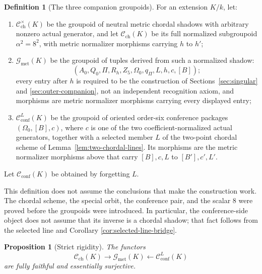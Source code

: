\documentclass[11pt]{article}
\newtheorem{proposition}[theorem]{Proposition}
\theoremstyle{definition}
\newtheorem{definition}[theorem]{Definition}
\theoremstyle{remark}
\newcommand{\cC}{\mathscr C}
\newcommand{\cG}{\mathscr G}
\begin{document}
\begin{definition}[The three companion groupoids]
\label{def:three-groupoids}
For an extension \(K/k\), let:
\begin{enumerate}[label=\textup{(\alph*)},leftmargin=2.4em]
\item \(\cC_{\mathrm{ch}}^\times(K)\) be the groupoid of neutral metric
  chordal shadows with arbitrary nonzero actual generator, and let
  \(\cC_{\mathrm{ch}}(K)\) be its full normalized subgroupoid
  \(\alpha^2=8^2\), with metric normalizer morphisms carrying \(h\) to
  \(h'\);
\item \(\cG_{\mathrm{met}}(K)\) be the groupoid of tuples derived from such a
  normalized shadow:
  \[
  (A_0,Q_0,\Pi,R_h,Z_5,\Omega_0,q_\Pi,L,h,c,[B]);
  \]
  every entry after \(h\) is required to be the construction of
  Sections~\ref{sec:singular} and \ref{sec:outer-companion}, not an
  independent recognition axiom, and morphisms are metric normalizer
  morphisms carrying every displayed entry;
\item \(\cC_{\mathrm{conf}}^L(K)\) be the groupoid of oriented order-six
  conference packages \((\Omega_0,[B],c)\), where \(c\) is one of the two
  coefficient-normalized actual generators, together with a selected member
  \(L\) of the two-point chordal scheme of
  Lemma~\ref{lem:two-chordal-lines}.  Its morphisms are the metric normalizer
  morphisms above that carry \([B],c,L\) to \([B'],c',L'\).
\end{enumerate}
Let \(\cC_{\mathrm{conf}}(K)\) be obtained by forgetting \(L\).
\end{definition}

This definition does not assume the conclusions that make the construction
work.  The chordal scheme, the special orbit, the conference pair, and the
scalar \(8\) were proved before the groupoids were introduced.  In
particular, the conference-side object does not assume that its inverse is a
chordal shadow; that fact follows from the selected line and Corollary
\ref{cor:selected-line-bridge}.

\begin{proposition}[Strict rigidity]
\label{prop:strict-rigidity}
The functors
\[
 \cC_{\mathrm{ch}}(K)\longrightarrow\cG_{\mathrm{met}}(K)
 \longleftarrow\cC_{\mathrm{conf}}^L(K)
\]
are fully faithful and essentially surjective.
\end{proposition}
\end{document}
